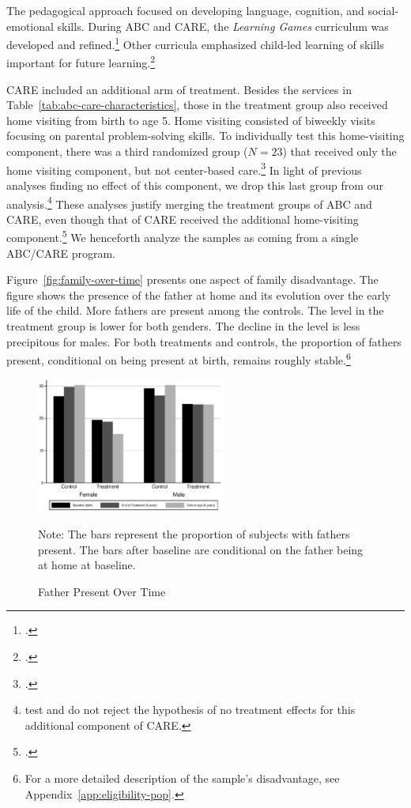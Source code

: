 The pedagogical approach focused on developing language, cognition, and social-emotional skills. During ABC and CARE, the \textit{Learning Games} curriculum was developed and refined.\footnote{\citet{Sparling_Lewis_1979_BOOKLearninggamesFirstThree}.} Other curricula emphasized child-led learning of skills important for future learning.\footnote{\citet{Conti_etal_2016_LongTermHealth}.}

CARE included an additional arm of treatment. Besides the services in Table~\ref{tab:abc-care-characteristics}, those in the treatment group also received home visiting from birth to age 5. Home visiting consisted of biweekly visits focusing on parental problem-solving skills. To individually test this home-visiting component, there was a third randomized group ($N=23$) that received only the home visiting component, but not center-based care.\footnote{\citet{Wasik_Ramey_etal_1990_CD}.} In light of previous analyses finding no effect of this component, we drop this last group from our analysis.\footnote{\citet{Campbell_Conti_etal_2014_EarlyChildhoodInvestments} test and do not reject the hypothesis of no treatment effects for this additional component of CARE.} These analyses justify merging the treatment groups of ABC and CARE, even though that of CARE received the additional home-visiting component.\footnote{\citet{ABCCARE_Dataset}.} We henceforth analyze the samples as coming from a single ABC/CARE program.

Figure~\ref{fig:family-over-time} presents one aspect of family disadvantage.  The figure shows the presence of the father at home and its evolution over the early life of the child. More fathers are present among the controls. The level in the treatment group is lower for both genders. The decline in the level is less precipitous for males. For both treatments and controls, the proportion of fathers present, conditional on being present at birth, remains roughly stable.\footnote{For a more detailed description of the sample's disadvantage, see Appendix~\ref{app:eligibility-pop}.}

\begin{figure}[H]
\begin{center}
\caption{Father Present Over Time}
\label{fig:family-over-time}
		\label{fig:fhome}
			\includegraphics[width=0.55\textwidth]{output/family-fhome}
\end{center}
\footnotesize \justify
Note: The bars represent the proportion of subjects with fathers present. The bars after baseline are conditional on the father being at home at baseline.
\end{figure}

